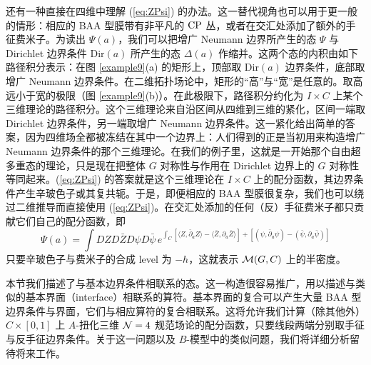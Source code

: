 还有一种直接在四维中理解 (\ref{eq:ZPsi}) 的办法。这一替代视角也可以用于更一般的情形：相应的 BAA 型膜带有非平凡的 ${\mathrm{CP}}$ 丛，或者在交汇处添加了额外的手征费米子。为读出 $\Psi(a)$，我们可以把增广 Neumann 边界所产生的态 $\Psi$ 与 Dirichlet 边界条件 $\mathrm{Dir}(a)$ 所产生的态 $\Delta(a)$ 作缩并。这两个态的内积由如下路径积分表示：在图 \ref{example9}(a) 的矩形上，顶部取 $\mathrm{Dir}(a)$ 边界条件，底部取增广 Neumann 边界条件。在二维拓扑场论中，矩形的“高”与“宽”是任意的。取高远小于宽的极限（图 \ref{example9}(b)）。在此极限下，路径积分约化为 $I\times C$ 上某个三维理论的路径积分。这个三维理论来自沿区间从四维到三维的紧化，区间一端取 Dirichlet 边界条件，另一端取增广 Neumann 边界条件。这一紧化给出简单的答案，因为四维场全都被冻结在其中一个边界上：人们得到的正是当初用来构造增广 Neumann 边界条件的那个三维理论。在我们的例子里，这就是一开始那个自由超多重态的理论，只是现在把整体 $G$ 对称性与作用在 Dirichlet 边界上的 $G$ 对称性等同起来。(\ref{eq:ZPsi}) 的答案就是这个三维理论在 $I\times C $ 上的配分函数，其边界条件产生辛玻色子或其复共轭。于是，即便相应的 BAA 型膜很复杂，我们也可以绕过二维推导而直接使用 (\ref{eq:ZPsi})。在交汇处添加的任何（反）手征费米子都只贡献它们自己的配分函数，即
\begin{equation}\label{eq:ZPsifer}
\Psi(a) = \int DZ D\bar Z D\psi D\bar \psi \,e^{\int_C \left[\langle Z, \bar \partial_a Z \rangle -  \langle 
\bar Z, \partial_a \bar Z \rangle\right]+\left[( \psi, \bar \partial_a \psi ) - ( 
\bar \psi, \partial_a \bar \psi)\right]}
\end{equation} 
只要辛玻色子与费米子的合成 level 为 $-h$，这就表示 ${\mathcal M}(G,C)$ 上的半密度。

本节我们描述了与基本边界条件相联系的态。这一构造很容易推广，用以描述与类似的基本界面（interface）相联系的算符。基本界面的复合可以产生大量 BAA 型边界条件与界面，它们与相应算符的复合相联系。这将允许我们计算（除其他外）$C \times [0,1]$ 上 $A$-扭化三维 ${\cal N}=4$ 规范场论的配分函数，只要线段两端分别取手征与反手征边界条件。关于这一问题以及 $B$-模型中的类似问题，我们将详细分析留待将来工作。
